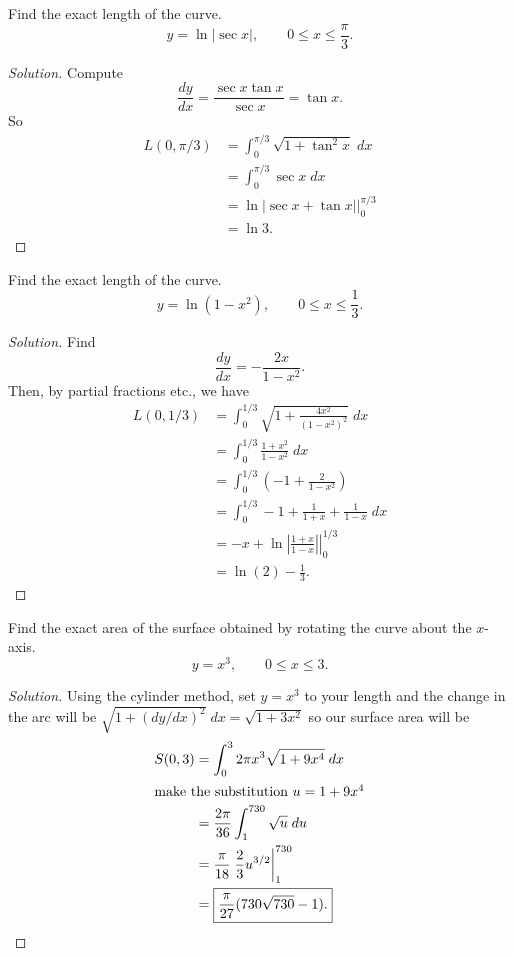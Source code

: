 \begin{problem}[WebAssign, HW 17, \# 3]
Find the exact length of the curve.
\[
y=\ln|\sec x|,\qquad 0\leq x\leq\frac{\pi}{3}.
\]
\end{problem}
\begin{proof}[Solution]
Compute
\[
\frac{dy}{dx}=\frac{\sec x\tan x}{\sec x}=\tan x.
\]
So
\begin{align*}
L(0,\pi/3)
&=\int_0^{\pi/3}\sqrt{1+\tan^2 x}\;dx\\
&=\int_0^{\pi/3}\sec x\;dx\\
&=\left.\ln|\sec x+\tan x|\right|_0^{\pi/3}\\
&=\boxed{\ln 3}.
\end{align*}
\end{proof}

\begin{problem}[WebAssign, HW 17, \# 4]
Find the exact length of the curve.
\[
y=\ln\left(1-x^2\right),\qquad 0\leq x\leq\frac{1}{3}.
\]
\end{problem}
\begin{proof}[Solution]
Find
\[
\frac{dy}{dx}=-\frac{2x}{1-x^2}.
\]
Then, by partial fractions etc., we have
\begin{align*}
L(0,1/3)
&=\int_0^{1/3}\sqrt{1+\frac{4x^2}{\left(1-x^2\right)^2}}\;dx\\
&=\int_0^{1/3}\frac{1+x^2}{1-x^2}\;dx\\
&=\int_0^{1/3}\left(-1+\frac{2}{1-x^2}\right)\\
&=\int_0^{1/3}-1+\frac{1}{1+x}+\frac{1}{1-x}\;dx\\
&=\left.-x+\ln\left|\frac{1+x}{1-x}\right|\right|_0^{1/3}\\
&=\boxed{\ln(2)-\frac{1}{3}.}
\end{align*}
\end{proof}

\begin{problem}[WebAssign, HW 17, \# 5]
Find the exact area of the surface obtained by rotating the curve about the
$x$-axis.
\[
y=x^3,\qquad 0\leq x\leq 3.
\]
\end{problem}
\begin{proof}[Solution]
Using the cylinder method, set $y=x^3$ to your length and the change in the
arc will be $\sqrt{1+(dy/dx)^2}\;dx=\sqrt{1+3x^2}$ so our surface area will be
\begin{align*}
S(0,3)
&=\int_0^32\pi x^3\sqrt{1+9x^4}\;dx\\
\intertext{make the substitution $u=1+9x^4$}
&=\frac{2\pi}{36}\int_1^{730}\sqrt{u}\;du\\
&=\frac{\pi}{18}\left.\frac{2}{3}u^{3/2}\right|_1^{730}\\
&=\boxed{\frac{\pi}{27}(730\sqrt{730}-1).}
\end{align*}
\end{proof}


